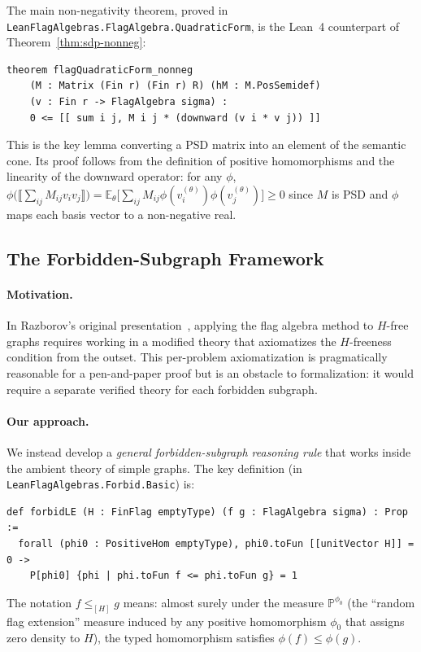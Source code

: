 \documentclass{article}
\newcommand{\lean}[1]{\texttt{#1}}
\begin{document}
The main non-negativity theorem, proved in
\lean{LeanFlagAlgebras.FlagAlgebra.QuadraticForm}, is the Lean~4 counterpart
of Theorem~\ref{thm:sdp-nonneg}:
\begin{lstlisting}
theorem flagQuadraticForm_nonneg
    (M : Matrix (Fin r) (Fin r) R) (hM : M.PosSemidef)
    (v : Fin r -> FlagAlgebra sigma) :
    0 <= [[ sum i j, M i j * (downward (v i * v j)) ]]
\end{lstlisting}
This is the key lemma converting a PSD matrix into an element of the semantic
cone.  Its proof follows from the definition of positive homomorphisms and
the linearity of the downward operator: for any $\phi$,
$\phi\bigl(\llbracket \sum_{ij} M_{ij} v_i v_j \rrbracket\bigr)
= \mathbb{E}_\theta\bigl[\sum_{ij} M_{ij} \phi(v_i^{(\theta)}) \phi(v_j^{(\theta)})\bigr] \geq 0$
since $M$ is PSD and $\phi$ maps each basis vector to a non-negative real.

\subsection{The Forbidden-Subgraph Framework}
\label{sec:forbidden}

\paragraph{Motivation.}
In Razborov's original presentation~\cite{razborov2007flag}, applying the
flag algebra method to $H$-free graphs requires working in a modified theory
that axiomatizes the $H$-freeness condition from the outset.  This
per-problem axiomatization is pragmatically reasonable for a pen-and-paper
proof but is an obstacle to formalization: it would require a separate
verified theory for each forbidden subgraph.

\paragraph{Our approach.}
We instead develop a \emph{general forbidden-subgraph reasoning rule} that
works inside the ambient theory of simple graphs.  The key definition
(in \lean{LeanFlagAlgebras.Forbid.Basic}) is:
\begin{lstlisting}
def forbidLE (H : FinFlag emptyType) (f g : FlagAlgebra sigma) : Prop :=
  forall (phi0 : PositiveHom emptyType), phi0.toFun [[unitVector H]] = 0 ->
    P[phi0] {phi | phi.toFun f <= phi.toFun g} = 1
\end{lstlisting}
The notation $f \leq_{[H]} g$ means: almost surely under the measure
$\mathbb{P}^{\phi_0}$ (the ``random flag extension'' measure induced by any
positive homomorphism $\phi_0$ that assigns zero density to $H$), the typed
homomorphism satisfies $\phi(f) \leq \phi(g)$.
\end{document}
